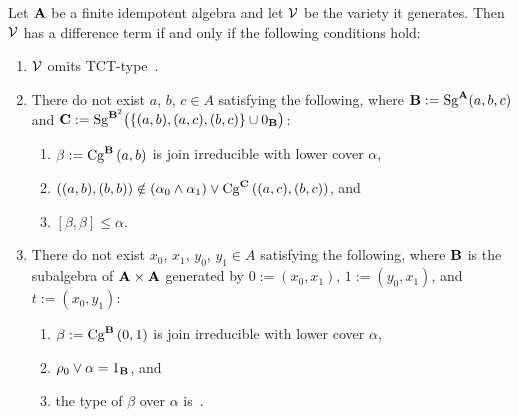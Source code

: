 \documentclass{ws-ijac}
\begin{document}
\begin{theorem}\label{thm:algorithm}
Let $\alg A$ be a finite idempotent algebra and let $\sV$ be the variety
it generates. Then $\sV$ has a difference term if and only if the
following conditions hold:
\begin{enumerate}

   \item \label{it:1}$\sV$ omits TCT-type~\utyp.
  \item \label{it:2}
    There do not exist $a$, $b$, $c\in A$
    satisfying the following, where
    $\alg B := \Sg^{\alg A}(a, b, c)$ and
    $\alg C:=\Sg^{\alg{B}^2}\bigl(\{(a,b), (a,c), (b, c)\}
                        \cup 0_{\alg B}\bigr)$:
    \begin{enumerate}
      \item \label{it:2a}
        $\beta := \Cga a b B$ is join irreducible with lower cover $\alpha$,
      \item \label{it:2b}
        $((a,b),(b,b)) \notin (\alpha_0 \meet \alpha_1) \join \Cga {(a,c)} {(b,c)} C$,  and
      \item \label{it:2c}
        $[\beta,\beta] \le \alpha$.
    \end{enumerate}

  \item \label{it:3}
    There do not exist $x_0$, $x_1$, $y_0$, $y_1\in A$ satisfying
    the following, where $\alg B$ is the subalgebra of
    $\alg A \times \alg A$ generated by $0 := (x_0, x_1)$, $1 := (y_0,x_1)$,
    and $t := (x_0,y_1)$:
    \begin{enumerate}
      \item \label{it:3a}
        $\beta := \Cga01{B}$ is join irreducible with lower cover $\alpha$,
      \item \label{it:3b}
        $\rho_0 \join \alpha = 1_{\alg B}$, and
      \item \label{it:3c}
        the type of $\beta$ over  $\alpha$ is~\atyp.
    \end{enumerate}
  \end{enumerate}
\end{theorem}
\end{document}
